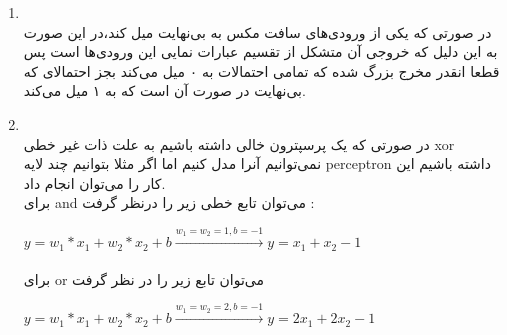 
\begin{enumerate}
    \item \phantom{text}
    \\
      در صورتی که یکی از ورودی‌های سافت مکس به بی‌نهایت میل کند،‌در این صورت به این دلیل که خروجی آن متشکل از تقسیم عبارات نمایی این ورودی‌ها است پس قطعا انقدر مخرج بزرگ شده که تمامی احتمالات به ۰ میل می‌کند بجز احتمالای که بی‌نهایت در صورت آن است که به ۱ میل ‌می‌کند.
    
    \item \phantom{text}
    \\
    در صورتی که یک پرسپترون خالی داشته باشیم به علت ذات غیر خطی xor نمی‌توانیم آنرا مدل کنیم اما اگر مثلا بتوانیم چند لایه perceptron داشته باشیم این کار را می‌توان انجام داد.
    \\
    برای and می‌توان تابع خطی زیر را درنظر گرفت :‌ 
    \\
    \begin{latin}
      \begin{center}
        $y = w_1 * x_1 + w_2 * x_2 + b \xrightarrow[]{w_1 = w_2 = 1 , b = -1}y = x_1 + x_2 - 1$
      \end{center}
    \end{latin}
    برای or می‌توان تابع زیر را در نظر گرفت
    \\
    \begin{latin}
      \begin{center}
        $y = w_1 * x_1 + w_2 * x_2 + b \xrightarrow[]{w_1 = w_2 = 2 , b = -1}y = 2x_1 + 2x_2 - 1$
      \end{center}
    \end{latin}
  \end{enumerate}





